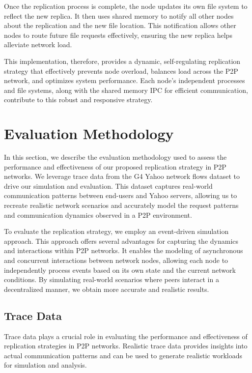 \documentclass[10pt, conference]{IEEEtran}
\begin{document}
Once the replication process is complete, the node updates its own file system to reflect the new replica. It then uses shared memory to notify all other nodes about the replication and the new file location. This notification allows other nodes to route future file requests effectively, ensuring the new replica helps alleviate network load.

This implementation, therefore, provides a dynamic, self-regulating replication strategy that effectively prevents node overload, balances load across the P2P network, and optimizes system performance. Each node's independent processes and file systems, along with the shared memory IPC for efficient communication, contribute to this robust and responsive strategy.
\section{Evaluation Methodology}\label{sec:evaluation}
In this section, we describe the evaluation methodology used to assess the performance and effectiveness of our proposed replication strategy in P2P networks. We leverage trace data from the G4 Yahoo network flows dataset to drive our simulation and evaluation. This dataset captures real-world communication patterns between end-users and Yahoo servers, allowing us to recreate realistic network scenarios and accurately model the request patterns and communication dynamics observed in a P2P environment.

To evaluate the replication strategy, we employ an event-driven simulation approach. This approach offers several advantages for capturing the dynamics and interactions within P2P networks. It enables the modeling of asynchronous and concurrent interactions between network nodes, allowing each node to independently process events based on its own state and the current network conditions. By simulating real-world scenarios where peers interact in a decentralized manner, we obtain more accurate and realistic results.
\subsection{Trace Data}
Trace data plays a crucial role in evaluating the performance and effectiveness of replication strategies in P2P networks. Realistic trace data provides insights into actual communication patterns and can be used to generate realistic workloads for simulation and analysis.
\end{document}
